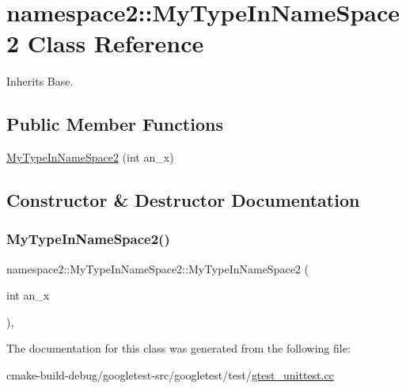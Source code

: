 \hypertarget{classnamespace2_1_1MyTypeInNameSpace2}{}\section{namespace2\+::My\+Type\+In\+Name\+Space2 Class Reference}
\label{classnamespace2_1_1MyTypeInNameSpace2}


Inherits Base.

\subsection*{Public Member Functions}
\begin{DoxyCompactItemize}
\item 
\mbox{\hyperlink{classnamespace2_1_1MyTypeInNameSpace2_a033025628289dbf29022b2bfbe66f53e}{My\+Type\+In\+Name\+Space2}} (int an\+\_\+x)
\end{DoxyCompactItemize}


\subsection{Constructor \& Destructor Documentation}
\mbox{\label{classnamespace2_1_1MyTypeInNameSpace2_a033025628289dbf29022b2bfbe66f53e}} 
\subsubsection{\texorpdfstring{MyTypeInNameSpace2()}{MyTypeInNameSpace2()}}
{\footnotesize\ttfamily namespace2\+::\+My\+Type\+In\+Name\+Space2\+::\+My\+Type\+In\+Name\+Space2 (\begin{DoxyParamCaption}\item[{int}]{an\+\_\+x }\end{DoxyParamCaption})\hspace{0.3cm}{\ttfamily [inline]}, {\ttfamily [explicit]}}



The documentation for this class was generated from the following file\+:\begin{DoxyCompactItemize}
\item 
cmake-\/build-\/debug/googletest-\/src/googletest/test/\mbox{\hyperlink{gtest__unittest_8cc}{gtest\+\_\+unittest.\+cc}}\end{DoxyCompactItemize}
